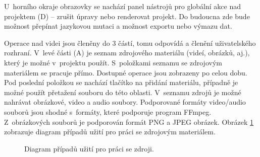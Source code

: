U~horního okraje obrazovky se nachází panel nástrojů pro globální akce nad projektem (D) -- zrušit úpravy nebo renderovat projekt. Do budoucna zde bude možnost přepínat jazykovou mutaci a možnost exportu nebo výmazu dat.

Operace nad videi jsou členěny do 3 částí, tomu odpovídá a členění uživatelského rozhraní. V~levé části (A) je seznam zdrojového materiálu (videí, obrázků, aj.), který je možné v~projektu použít. S~položkami seznamu se zdrojovým materiálem se pracuje přímo. Dostupné operace jsou zobrazeny po celou dobu. Pod poslední položkou se nachází tlačítko na přidání materiálu, případně je možné použít přetažení souboru do této oblasti. V~seznamu zdrojů je možné nahrávat obrázkové, video a audio soubory. Podporované formáty video/audio souborů jsou shodné s~formáty, které podporuje program FFmpeg. Z~obrázkových souborů je podporován formát PNG a JPEG obrázek. Obrázek \ref{img:ucd-zdroj} zobrazuje diagram případů užití pro práci se zdrojovým materiálem.
\begin{figure}[h]
	\centering
	\caption{Diagram případů užití pro práci se zdroji.}\label{img:ucd-zdroj}
\end{figure}

